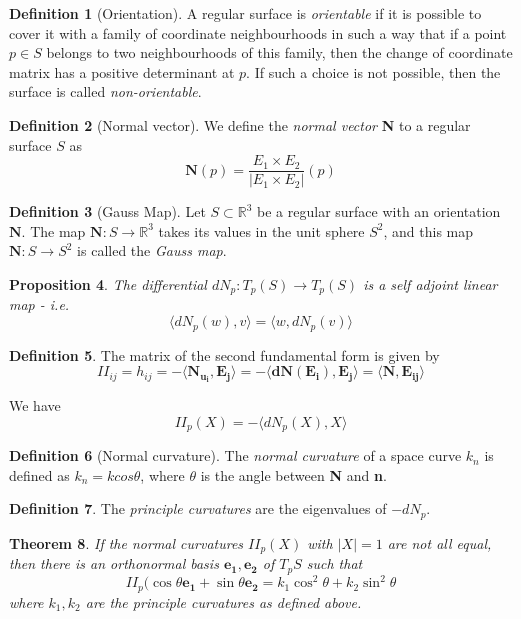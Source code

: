 \documentclass[10pt, oneside, reqno]{amsart}
\newcommand{\R}{\mathbb{R}}
\theoremstyle{plain}%
\newtheorem{thm}{Theorem}[section]
\newtheorem{prop}[thm]{Proposition}
\theoremstyle{definition}
\newtheorem{defn}[thm]{Definition}
\theoremstyle{remark}
\begin{document}
\begin{defn}[Orientation]
    A regular surface is \emph{orientable} if it is possible to cover it with a family of coordinate neighbourhoods in such a way that if a point $p \in S$ belongs to two neighbourhoods of this family, then the change of coordinate matrix has a positive determinant at $p$.  If such a choice is not possible, then the surface is called \emph{non-orientable}.
\end{defn}

\begin{defn}[Normal vector]
    We define the \emph{normal vector} \textbf{N} to a regular surface $S$ as \[
        \mathbf{N}(p) = \frac{E_1 \times E_2}{|E_1 \times E_2|}(p)
    \]
\end{defn}

\begin{defn}[Gauss Map]
    Let $S \subset \R^3$ be a regular surface with an orientation $\mathbf{N}$.  The map $\mathbf{N}: S \rightarrow \R^3$ takes its values in the unit sphere $S^2$, and this map $\mathbf{N}: S \rightarrow S^2$ is called the \emph{Gauss map}.  
\end{defn}

\begin{prop}
    The differential $dN_p : T_p(S) \rightarrow T_p(S)$ is a self adjoint linear map - \emph{i.e.} \[
        \langle dN_p(w),v \rangle = \langle w,dN_p(v) \rangle
    \]
\end{prop}

\begin{defn}
    The matrix of the second fundamental form is given by \[ II_{ij} = h_{ij} = -\langle \mathbf{N_{u_i}},\mathbf{E_j} \rangle = -\langle  \mathbf{dN(E_i)},\mathbf{E_j} \rangle = \langle \mathbf{N}, \mathbf{E_{ij}} \rangle \]

We have \[
    II_p(X) = - \langle dN_p(X),X \rangle
\]
\end{defn}

\begin{defn}[Normal curvature]
    The \emph{normal curvature} of a space curve $k_n$ is defined as $k_n = k cos \theta$, where $\theta$ is the angle between \textbf{N} and \textbf{n}.
\end{defn}

\begin{defn}
    The \emph{principle curvatures} are the eigenvalues of $-dN_p$.     
\end{defn}

\begin{thm}
    If the normal curvatures $  II_p(X) $ with $|X| = 1$ are not all equal, then there is an orthonormal basis $\mathbf{e_1}, \mathbf{e_2}$ of $T_p S$ such that \[
            II_p(\cos \theta \mathbf{e_1} + \sin \theta \mathbf{e_2} = k_1 \cos^2 \theta + k_2 \sin^2 \theta
    \]
    where $k_1,k_2$ are the principle curvatures as defined above.
\end{thm}
\end{document}
